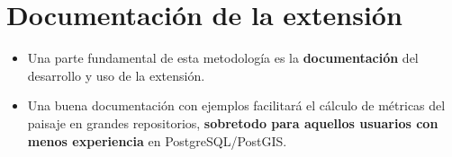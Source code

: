 \section{Documentación de la extensión}

\begin{graybox}
\begin{itemize}
\item Una parte fundamental de esta metodología es la \textbf{documentación} del desarrollo y uso de la extensión. 
\item Una buena documentación con ejemplos facilitará el cálculo de métricas del paisaje en grandes repositorios, \textbf{sobretodo para aquellos usuarios con menos experiencia} en PostgreSQL/PostGIS.
\end{itemize}
\end{graybox}

